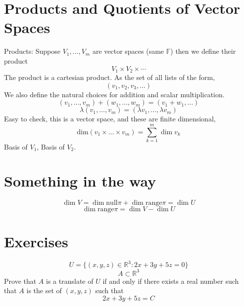 \documentclass[letter]{article}
\title{}
\author{Ahmed Saad Sabit, Rice University}
\date{\today}
\begin{document}
\maketitle
\section*{Products and Quotients of Vector Spaces} 
Products: Suppose $V_1, \ldots, V_m$ are vector spaces (same $\mathbb{F}$) then we define their product 
\[
V_1 \times V_2 \times  \cdots 
\] The product is a cartesian product. As the set of all lists of the form, 
\[
	(v_1, v_2, v_3, \ldots)
\]
We also define the natural choices for addition and scalar multiplication. 
\[
	(v_1, \ldots, v_m) + (w_1, \ldots, w_m)= (v_1 + w_1, \ldots)
\]
\[
\lambda (v_1, \ldots, v_m) = (\lambda v_1, \ldots , \lambda v_m)
\] 
Easy to check, this is a vector space, and these are finite dimensional, 
\[
\text{dim} (v_1 \times \ldots \times  v_m) = \sum_{k = 1}^{m} \dim v_k
\]
Basis of $V_1$, Basis of $V_2$. 

\section*{ Something in the way }
\[
	\dim V = \dim \text{null} \pi  + \dim \text{range} \pi = \dim U
\]
\[
\dim \text{range} \pi = \dim V - \dim U
\]

\section*{Exercises}
\[
U = \{(x,y,z) \in \mathbb{R}^{3} : 2 x + 3y + 5z = 0\} 
\] 
\[
A \subset \mathbb{R}^{3}
\] 	
Prove that $A$ is a translate of $U$ if and only if there exists a real number such that $A$ is the set of $(x,y,z)$ such that 
\[
2x + 3y + 5z = C
\] 
\end{document}
